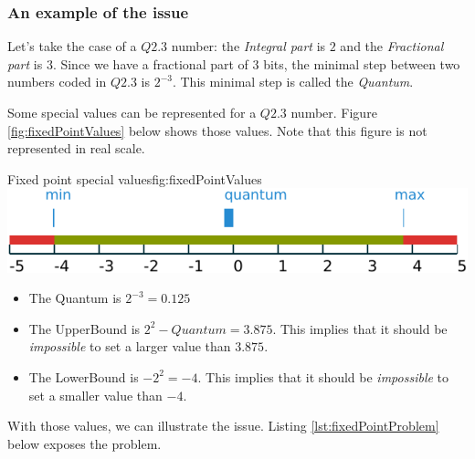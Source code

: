 \subsubsection{An example of the issue}

Let's take the case of a $Q2.3$ number: the \emph{Integral part} is $2$ and the
\emph{Fractional part} is $3$.
Since we have a fractional part of $3$ bits, the minimal step between two numbers coded in $Q2.3$ is
$2^{-3}$. This minimal step is called the \emph{Quantum}.

Some special values can be represented for a $Q2.3$ number. Figure \ref{fig:fixedPointValues} below shows those values. Note that
this figure is not represented in real scale.
\begin{figureGraphics}{Fixed point special values}{fig:fixedPointValues}
    \includegraphics[width=\textwidth]{./src/img/fixedPoint.pdf}
\end{figureGraphics}

\begin{itemize}
    \item The Quantum is $2^{-3} = 0.125$
    \item The UpperBound is $2^2 - Quantum = 3.875$.
        This implies that it should be \emph{impossible} to set a larger value than $3.875$.
    \item The LowerBound is $-2^2 = -4$.
        This implies that it should be \emph{impossible} to set a smaller value than $-4$.
\end{itemize}

With those values, we can illustrate the issue.
Listing \ref {lst:fixedPointProblem} below exposes the problem.



